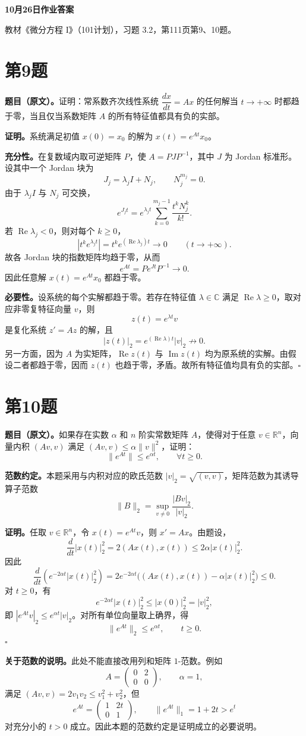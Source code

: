 \documentclass[11pt,a4paper]{ctexart}
\newcommand{\R}{\mathbb R}\newcommand{\C}{\mathbb C}
\begin{document}
\begin{center}\LARGE\bfseries 10月26日作业答案\end{center}
教材《微分方程 I》（101计划），习题 3.2，第111页第9、10题。

\section*{第9题}
\textbf{题目（原文）。}证明：常系数齐次线性系统 $\dfrac{dx}{dt}=Ax$ 的任何解当 $t\to+\infty$ 时都趋于零，当且仅当系数矩阵 $A$ 的所有特征值都具有负的实部。

\textbf{证明。}系统满足初值 $x(0)=x_0$ 的解为 $x(t)=e^{At}x_0$。

\textbf{充分性。}在复数域内取可逆矩阵 $P$，使 $A=PJP^{-1}$，其中 $J$ 为 Jordan 标准形。设其中一个 Jordan 块为
\[
J_j=\lambda_j I+N_j,\qquad N_j^{m_j}=0.
\]
由于 $\lambda_jI$ 与 $N_j$ 可交换，
\[
e^{J_jt}=e^{\lambda_jt}\sum_{k=0}^{m_j-1}\frac{t^kN_j^k}{k!}.
\]
若 $\operatorname{Re}\lambda_j<0$，则对每个 $k\ge0$，
\[
\left|t^ke^{\lambda_jt}\right|=t^ke^{(\operatorname{Re}\lambda_j)t}\longrightarrow0
\qquad(t\to+\infty).
\]
故各 Jordan 块的指数矩阵均趋于零，从而
\[
e^{At}=Pe^{Jt}P^{-1}\longrightarrow0.
\]
因此任意解 $x(t)=e^{At}x_0$ 都趋于零。

\textbf{必要性。}设系统的每个实解都趋于零。若存在特征值 $\lambda\in\C$ 满足 $\operatorname{Re}\lambda\ge0$，取对应非零复特征向量 $v$，则
\[
z(t)=e^{\lambda t}v
\]
是复化系统 $z'=Az$ 的解，且
\[
|z(t)|_2=e^{(\operatorname{Re}\lambda)t}|v|_2\not\longrightarrow0.
\]
另一方面，因为 $A$ 为实矩阵，$\operatorname{Re}z(t)$ 与 $\operatorname{Im}z(t)$ 均为原系统的实解。由假设二者都趋于零，因而 $z(t)$ 也趋于零，矛盾。故所有特征值均具有负的实部。\hfill$\square$

\section*{第10题}
\textbf{题目（原文）。}如果存在实数 $\alpha$ 和 $n$ 阶实常数矩阵 $A$，使得对于任意 $v\in\R^n$，向量内积 $(Av,v)$ 满足 $(Av,v)\le\alpha\|v\|^2$，证明：
\[
\|e^{At}\|\le e^{\alpha t},\qquad\forall t\ge0.
\]

\textbf{范数约定。}本题采用与内积对应的欧氏范数 $|v|_2=\sqrt{(v,v)}$，矩阵范数为其诱导算子范数
\[
\|B\|_2=\sup_{v\ne0}\frac{|Bv|_2}{|v|_2}.
\]

\textbf{证明。}任取 $v\in\R^n$，令 $x(t)=e^{At}v$，则 $x'=Ax$。由题设，
\[
\frac{d}{dt}|x(t)|_2^2=2(Ax(t),x(t))\le2\alpha|x(t)|_2^2.
\]
因此
\[
\frac{d}{dt}\left(e^{-2\alpha t}|x(t)|_2^2\right)
=2e^{-2\alpha t}\bigl((Ax(t),x(t))-\alpha|x(t)|_2^2\bigr)\le0.
\]
对 $t\ge0$，有
\[
e^{-2\alpha t}|x(t)|_2^2\le|x(0)|_2^2=|v|_2^2,
\]
即 $|e^{At}v|_2\le e^{\alpha t}|v|_2$。对所有单位向量取上确界，得
\[
\boxed{\|e^{At}\|_2\le e^{\alpha t},\qquad t\ge0.}
\]
\hfill$\square$

\textbf{关于范数的说明。}此处不能直接改用列和矩阵 $1$-范数。例如
\[
A=\begin{pmatrix}0&2\\0&0\end{pmatrix},\qquad\alpha=1,
\]
满足 $(Av,v)=2v_1v_2\le v_1^2+v_2^2$，但
\[
e^{At}=\begin{pmatrix}1&2t\\0&1\end{pmatrix},\qquad
\|e^{At}\|_1=1+2t>e^t
\]
对充分小的 $t>0$ 成立。因此本题的范数约定是证明成立的必要说明。
\end{document}
